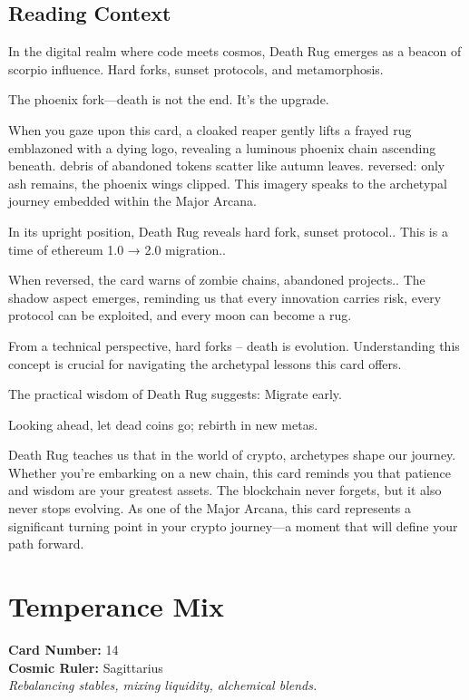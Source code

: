\documentclass[11pt,oneside]{book}
\begin{document}
\begin{minipage}[t]{0.55\textwidth}
  \subsection*{Reading Context}
  In the digital realm where code meets cosmos, Death Rug emerges as a beacon of scorpio influence. Hard forks, sunset protocols, and metamorphosis.

  The phoenix fork—death is not the end. It's the upgrade.

  When you gaze upon this card, a cloaked reaper gently lifts a frayed rug emblazoned with a dying logo, revealing a luminous phoenix chain ascending beneath. debris of abandoned tokens scatter like autumn leaves. reversed: only ash remains, the phoenix wings clipped. This imagery speaks to the archetypal journey embedded within the Major Arcana.

  In its upright position, Death Rug reveals hard fork, sunset protocol.. This is a time of ethereum 1.0 → 2.0 migration..

  When reversed, the card warns of zombie chains, abandoned projects.. The shadow aspect emerges, reminding us that every innovation carries risk, every protocol can be exploited, and every moon can become a rug.

  From a technical perspective, hard forks – death is evolution. Understanding this concept is crucial for navigating the archetypal lessons this card offers.

  The practical wisdom of Death Rug suggests: Migrate early.

  Looking ahead, let dead coins go; rebirth in new metas.

  Death Rug teaches us that in the world of crypto, archetypes shape our journey. Whether you're embarking on a new chain, this card reminds you that patience and wisdom are your greatest assets. The blockchain never forgets, but it also never stops evolving. As one of the Major Arcana, this card represents a significant turning point in your crypto journey—a moment that will define your path forward.

\end{minipage}

\newpage
\section*{Temperance Mix}

\begin{minipage}[t]{0.55\textwidth}
  \vspace{0pt}
  \textbf{Card Number:} 14\\  \textbf{Cosmic Ruler:} Sagittarius\\  \textit{Rebalancing stables, mixing liquidity, alchemical blends.}
\end{minipage}
\end{document}

